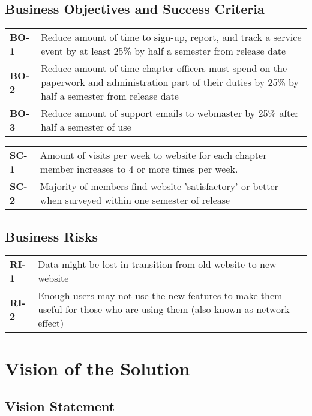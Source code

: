 \documentclass[11pt,letterpaper,rotate]{article}
\begin{document}
\subsection{Business Objectives and Success Criteria}
\FloatBarrier
\begin{longtable}{lp{12cm}}
{\bf BO-1} & Reduce amount of time to sign-up, report, and track a
service event by at least 25\% by half a semester from release date \\
{\bf BO-2} & Reduce amount of time chapter officers must spend on the
paperwork and administration part of their duties by 25\% by half a
semester from release date \\
{\bf BO-3} & Reduce amount of support emails to webmaster by 25\% after
half a semester of use \\
\end{longtable}

\FloatBarrier
\begin{longtable}{lp{12cm}}
{\bf SC-1} & Amount of visits per week to website for each chapter member
increases to 4 or more times per week. \\
{\bf SC-2} & Majority of members find website 'satisfactory' or better
when surveyed
within one semester of release\\
\end{longtable}

\FloatBarrier

\subsection{Business Risks}

\FloatBarrier
\begin{longtable}{lp{12cm}}
{\bf RI-1} & Data might be lost in transition from old website to new
website \\
{\bf RI-2} & Enough users may not use the new features to make them useful
for those who are using them (also known as network effect) \\
\end{longtable}

\section{Vision of the Solution}

\subsection{Vision Statement}
\end{document}
